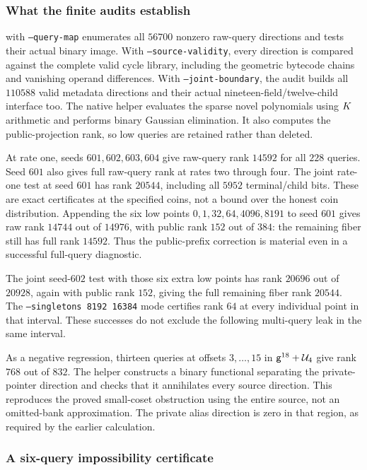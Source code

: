 \subsubsection{What the finite audits establish}

 with \texttt{--query-map} enumerates all $56700$ nonzero raw-query directions and tests their actual binary image. With \texttt{--source-validity}, every direction is compared against the complete valid cycle library, including the geometric bytecode chains and vanishing operand differences. With \texttt{--joint-boundary}, the audit builds all $110588$ valid metadata directions and their actual nineteen-field/twelve-child interface too. The native helper evaluates the sparse novel polynomials using $K$ arithmetic and performs binary Gaussian elimination. It also computes the public-projection rank, so low queries are retained rather than deleted.

At rate one, seeds $601,602,603,604$ give raw-query rank $14592$ for all $228$ queries. Seed $601$ also gives full raw-query rank at rates two through four. The joint rate-one test at seed $601$ has rank $20544$, including all $5952$ terminal/child bits. These are exact certificates at the specified coins, not a bound over the honest coin distribution. Appending the six low points $0,1,32,64,4096,8191$ to seed $601$ gives raw rank $14744$ out of $14976$, with public rank $152$ out of $384$: the remaining fiber still has full rank $14592$. Thus the public-prefix correction is material even in a successful full-query diagnostic.

The joint seed-$602$ test with those six extra low points has rank $20696$ out of $20928$, again with public rank $152$, giving the full remaining fiber rank $20544$. The \texttt{--singletons 8192 16384} mode certifies rank $64$ at every individual point in that interval. These successes do not exclude the following multi-query leak in the same interval.

As a negative regression, thirteen queries at offsets $3,\ldots,15$ in $\mathsf{g}^{18}+\mathcal{U}_4$ give rank $768$ out of $832$. The helper constructs a binary functional separating the private-pointer direction and checks that it annihilates every source direction. This reproduces the proved small-coset obstruction using the entire source, not an omitted-bank approximation. The private alias direction is zero in that region, as required by the earlier calculation.

\subsubsection{A six-query impossibility certificate}

